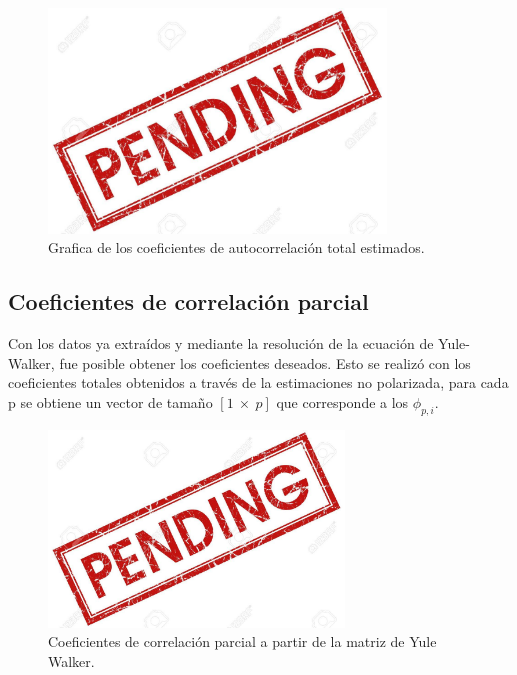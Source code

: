 \begin{figure}[H]
\centering
	\includegraphics[width=0.8\textwidth, trim = {0 0 0 0.7cm},clip]{./Imagenes/pend.jpg}
	\caption{Grafica de los coeficientes de autocorrelación total estimados.}
	\label{fig:rxx}
\end{figure}



\subsection{Coeficientes de correlación parcial}

Con los datos ya extraídos y mediante la resolución de la ecuación de Yule-Walker, fue posible obtener los coeficientes deseados. Esto se realizó con los coeficientes totales obtenidos a través de la estimaciones no polarizada, para cada p se obtiene un vector de tamaño $\left[ 1 \ \times \ p \right]$ que corresponde a los $\phi_{p,i}$.
\begin{figure}[H]
\centering
	\includegraphics[width=0.7\textwidth, trim = {0 0 0 0.7cm},clip]{./Imagenes/pend.jpg}
	\caption{Coeficientes de correlación parcial a partir de la matriz de Yule Walker.}
	\label{fig:phikk}
\end{figure}

